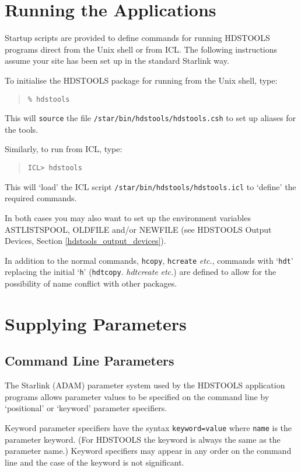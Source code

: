 \documentclass[twoside,11pt]{article}
\newcommand{\htmlref}[2]{#1}
\newcommand{\latex}[1]{#1}
\newcommand{\xref}[3]{#1}
\renewcommand{\_}{\texttt{\symbol{95}}}
\begin{document}
\section{Running the Applications}
Startup scripts are provided to define commands for running HDSTOOLS programs
direct from the Unix shell or from
\xref{ICL}{sg5}{}.
The following instructions assume your site has been set up in the standard
Starlink way.

To initialise the HDSTOOLS package for running from the Unix shell, type:
\begin{quote}
\texttt{\% hdstools}
\end{quote}
This will \texttt{source} the file \texttt{/star/bin/hdstools/hdstools.csh}
to set up aliases for the tools.

Similarly, to run from ICL, type:
\begin{quote}
\texttt{ICL> hdstools}
\end{quote}
This will `load' the ICL script \texttt{/star/bin/hdstools/hdstools.icl}
to `define' the required commands.

In both cases you may also want to set up the environment variables
AST\_LIST\_SPOOL, OLDFILE and/or NEWFILE (see
\htmlref{HDSTOOLS Output Devices}{hdstools_output_devices}\latex{, Section \ref{hdstools_output_devices}}).

In addition to the normal commands, \texttt{hcopy}, \texttt{hcreate}
\textit{etc.}, commands with `\texttt{hdt\_}' replacing the initial
`\texttt{h}' (\texttt{hdt\_copy}. \textit{hdt\_create} \textit{etc.}) are
defined to allow for the possibility of name conflict with other packages.

\section{Supplying Parameters}

\subsection{Command Line Parameters}
The Starlink (ADAM) parameter system used by the HDSTOOLS application programs
allows parameter values to be specified on the command line by `positional' or
`keyword' parameter specifiers. 

Keyword parameter specifiers have the syntax
\texttt{keyword=value} where \texttt{name} is the parameter keyword.
(For HDSTOOLS the keyword is always the same as the parameter name.)
Keyword specifiers may appear in any order on the command line and the case of
the keyword is not significant. 
\end{document}
